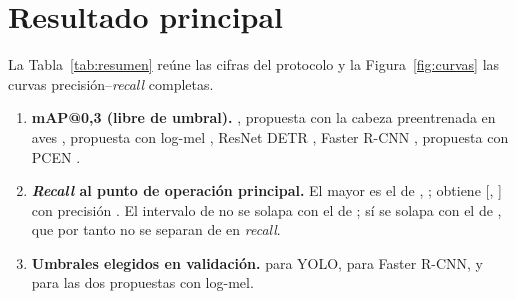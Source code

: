 \documentclass[12pt,a4paper]{article}
\begin{document}
\section{Resultado principal}

La Tabla~\ref{tab:resumen} reúne las cifras del protocolo y la Figura~\ref{fig:curvas} las
curvas precisión--\textit{recall} completas.

\begin{enumerate}
    \item \textbf{mAP@0,3 (libre de umbral).} \bestModel{} \bestMap{}, propuesta con la
          cabeza preentrenada en aves \birdsMap{}, propuesta con log-mel \logmelMap{}, ResNet
          DETR \resnetMap{}, Faster R-CNN \frcnnMap{}, propuesta con PCEN \pcenMap{}.
    \item \textbf{\textit{Recall} al punto de operación principal.} El mayor es el de
          \topRecallModel{}, \topRecall{}; \bestModel{} obtiene \bestRecall{}
          [\bestRecallLow{}, \bestRecallHigh{}] con precisión \bestPrecision{}. El intervalo
          de \bestModel{} no se solapa con el de \separated{}; sí se solapa con el de
          \overlapping{}, que por tanto no se separan de \bestModel{} en \textit{recall}.
    \item \textbf{Umbrales elegidos en validación.} \yoloThreshold{} para YOLO,
          \frcnnThreshold{} para Faster R-CNN, \logmelThreshold{} y \birdsThreshold{} para
          las dos propuestas con log-mel.
\end{enumerate}
\end{document}
